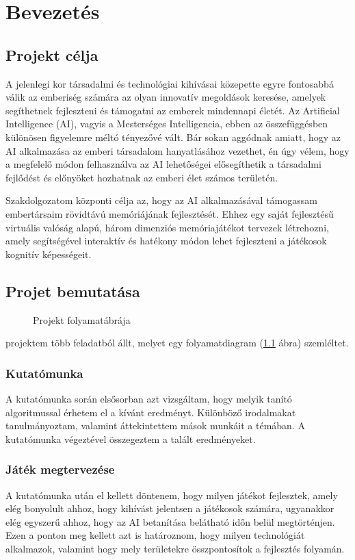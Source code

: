 \chapter{Bevezetés}
\usetikzlibrary{shapes,arrows}

\thispagestyle{fancy}
\pagestyle{fancy}
\section{Projekt célja}
A jelenlegi kor társadalmi és technológiai kihívásai közepette egyre fontosabbá válik az emberiség számára az olyan innovatív megoldások keresése, amelyek segíthetnek fejleszteni és támogatni az emberek mindennapi életét. Az Artificial Intelligence (AI), vagyis a Mesterséges Intelligencia, ebben az összefüggésben különösen figyelemre méltó tényezővé vált. Bár sokan aggódnak amiatt, hogy az AI alkalmazása az emberi társadalom hanyatlásához vezethet, én úgy vélem, hogy a megfelelő módon felhasználva az AI lehetőségei elősegíthetik a társadalmi fejlődést és előnyöket hozhatnak az emberi élet számos területén.

Szakdolgozatom központi célja az, hogy az AI alkalmazásával támogassam embertársaim rövidtávú memóriájának fejlesztését. Ehhez egy saját fejlesztésű virtuális valóság alapú, három dimenziós memóriajátékot tervezek létrehozni, amely segítségével interaktív és hatékony módon lehet fejleszteni a játékosok kognitív képességeit. 
\section{Projet bemutatása}
\begin{figure}[H]
    \centering
    
    \caption{Projekt folyamatábrája}
    \label{fig:folyamat_diagram}
\end{figure}
projektem több feladatból állt, melyet egy folyamatdiagram (\ref{fig:folyamat_diagram} ábra) szemléltet.

\subsection{Kutatómunka}
A kutatómunka során elsősorban azt vizsgáltam, hogy melyik tanító algoritmussal érhetem el a kívánt eredményt. Különböző irodalmakat tanulmányoztam, valamint áttekintettem mások munkáit a témában. A kutatómunka végeztével összegeztem a talált eredményeket.

\subsection{Játék megtervezése}
A kutatómunka után el kellett döntenem, hogy milyen játékot fejlesztek, amely elég bonyolult ahhoz, hogy kihívást jelentsen a játékosok számára, ugyanakkor elég egyszerű ahhoz, hogy az AI betanítása belátható időn belül megtörténjen. Ezen a ponton meg kellett azt is határoznom, hogy milyen technológiát alkalmazok, valamint hogy mely területekre összpontosítok a fejlesztés folyamán.

